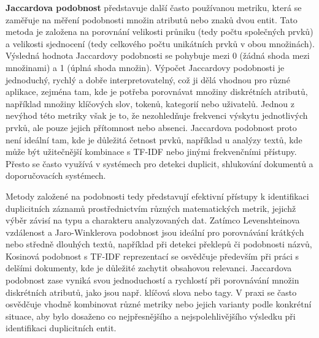 \textbf{Jaccardova podobnost} představuje další často používanou metriku, která se zaměřuje na měření podobnosti množin atributů nebo znaků dvou entit. Tato metoda je založena na porovnání velikosti průniku (tedy počtu společných prvků) a velikosti sjednocení (tedy celkového počtu unikátních prvků v obou množinách). Výsledná hodnota Jaccardovy podobnosti se pohybuje mezi 0 (žádná shoda mezi množinami) a 1 (úplná shoda množin). Výpočet Jaccardovy podobnosti je jednoduchý, rychlý a dobře interpretovatelný, což ji dělá vhodnou pro různé aplikace, zejména tam, kde je potřeba porovnávat množiny diskrétních atributů, například množiny klíčových slov, tokenů, kategorií nebo uživatelů. Jednou z nevýhod této metriky však je to, že nezohledňuje frekvenci výskytu jednotlivých prvků, ale pouze jejich přítomnost nebo absenci. Jaccardova podobnost proto není ideální tam, kde je důležitá četnost prvků, například u analýzy textů, kde může být užitečnější kombinace s TF-IDF nebo jinými frekvenčními přístupy. Přesto se často využívá v systémech pro detekci duplicit, shlukování dokumentů a doporučovacích systémech.

Metody založené na podobnosti tedy představují efektivní přístupy k identifikaci duplicitních záznamů prostřednictvím různých matematických metrik, jejichž výběr závisí na typu a charakteru analyzovaných dat. Zatímco Levenshteinova vzdálenost a Jaro-Winklerova podobnost jsou ideální pro porovnávání krátkých nebo středně dlouhých textů, například při detekci překlepů či podobnosti názvů, Kosinová podobnost s TF-IDF reprezentací se osvědčuje především při práci s delšími dokumenty, kde je důležité zachytit obsahovou relevanci. Jaccardova podobnost zase vyniká svou jednoduchostí a rychlostí při porovnávání množin diskrétních atributů, jako jsou např. klíčová slova nebo tagy. V praxi se často osvědčuje vhodně kombinovat různé metriky nebo jejich varianty podle konkrétní situace, aby bylo dosaženo co nejpřesnějšího a nejspolehlivějšího výsledku při identifikaci duplicitních entit.

